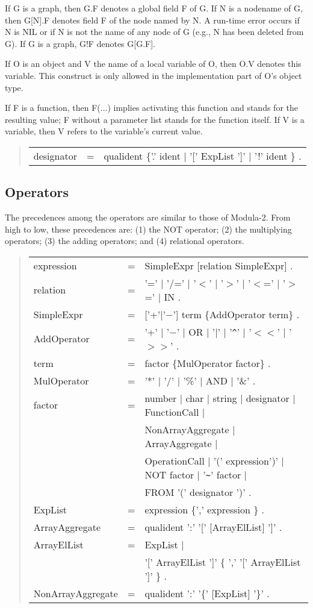 \documentclass[10pt]{article}
\newenvironment{grammar}
{\begin{quote} \begin{tabular}{p{3.8cm} l l}}
{\end{tabular}\end{quote}}
\begin{document}
If G is a graph, then G.F denotes a global field F of G.
If N is a nodename of G, then G[N].F denotes
field F of the node named by N.
A run-time error occurs if N is NIL
or if N is not the name of any node of G
(e.g., N has been deleted from G).
If G is a graph, G!F denotes G[G.F].

If O is an object and V the name of a local variable of O, then
O.V denotes this variable. This construct is only allowed in the
implementation part of O's object type.

If F is a function, then F(...) implies activating this function and
stands for the resulting value; F without a parameter list stands
for the function itself.
If V is a variable, then V refers to the variable's current value.
\begin{grammar}
designator & = & qualident \{'.' ident $|$ '[' ExpList ']' $|$ '!' ident \} .
\end{grammar}
\subsection{Operators}

The precedences among the operators are similar to those of Modula-2.
From high to low, these precedences are:
(1) the NOT operator; (2) the multiplying operators;
(3) the adding operators; and (4) relational operators.
\begin{grammar}
expression & = & SimpleExpr [relation SimpleExpr] . \\
relation & = & '=' $|$ '/=' $|$ '$<$' $|$ '$>$' $|$ '$<$=' $|$ '$>$=' $|$ IN . \\
SimpleExpr & = & ['+'$|$'$-$'] term \{AddOperator term\} . \\
AddOperator & = & '+' $|$ '$-$' $|$ OR $|$ '$|$' $|$ '\verb+^+' $|$ '$<<$' $|$ '$>>$'  . \\
term & = & factor \{MulOperator factor\} . \\
MulOperator & = & '*' $|$ '/' $|$  '\%' $|$ AND $|$ '\&' . \\
factor & = & number $|$ char $|$ string $|$ designator $|$ FunctionCall $|$ \\
& & NonArrayAggregate $|$ ArrayAggregate $|$ \\
& & OperationCall $|$ '(' expression')' $|$ NOT factor $|$ '\verb+~+' factor $|$ \\
& & FROM '(' designator ')' . \\
ExpList & = & expression \{',' expression \} . \\
ArrayAggregate & = & qualident ':' '['  [ArrayElList] ']' . \\
ArrayElList & = & ExpList $|$  \\
& & '[' ArrayElList ']' \{ ',' '[' ArrayElList ']' \} . \\
NonArrayAggregate & = & qualident ':' '\{'  [ExpList] '\}' .
\end{grammar}
\end{document}
